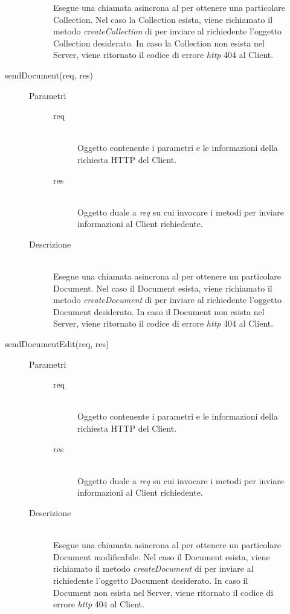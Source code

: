 \begin{description}
\begin{description}
\begin{description}
 Esegue una chiamata asincrona al  per ottenere una particolare Collection. Nel caso la Collection esista, viene richiamato il metodo \textit{createCollection} di  per inviare al richiedente l'oggetto Collection desiderato. In caso la Collection non esista nel Server, viene ritornato il codice di errore \textit{http} 404 al Client.
 \end{description}
 
 \item[sendDocument(req, res)] \hfill 
 \begin{description}
 \item[Parametri] \hfill
  \begin{description}
   \item[req] \hfill \\
   Oggetto contenente i parametri e le informazioni della richiesta HTTP del Client.
   \item[res] \hfill \\
   Oggetto duale a \textit{req} su cui invocare i metodi per inviare informazioni al Client richiedente.
  \end{description}
 \item[Descrizione] \hfill \\
 Esegue una chiamata asincrona al  per ottenere un particolare Document. Nel caso il Document esista, viene richiamato il metodo \textit{createDocument} di  per inviare al richiedente l'oggetto Document desiderato. In caso il Document non esista nel Server, viene ritornato il codice di errore \textit{http} 404 al Client.
 \end{description}
 
 \item[sendDocumentEdit(req, res)] \hfill 
 \begin{description}
 \item[Parametri] \hfill
  \begin{description}
   \item[req] \hfill \\
   Oggetto contenente i parametri e le informazioni della richiesta HTTP del Client.
   \item[res] \hfill \\
   Oggetto duale a \textit{req} su cui invocare i metodi per inviare informazioni al Client richiedente.
  \end{description}
 \item[Descrizione] \hfill \\
 Esegue una chiamata asincrona al  per ottenere un particolare Document modificabile. Nel caso il Document esista, viene richiamato il metodo \textit{createDocument} di  per inviare al richiedente l'oggetto Document desiderato. In caso il Document non esista nel Server, viene ritornato il codice di errore \textit{http} 404 al Client.
 \end{description}
 

\end{description}
\end{description}
